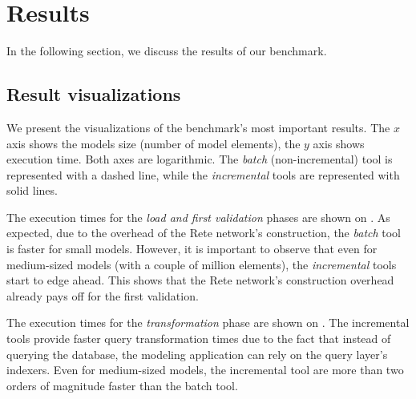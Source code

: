 \section{Results}
\label{evaluation-results}

In the following section, we discuss the results of our benchmark.

\subsection{Result visualizations}


We present the visualizations of the benchmark's most important results. The $x$ axis shows the models size (number of model elements), the $y$ axis shows execution time. Both axes are logarithmic. The \emph{batch} (non-incremental) tool is represented with a dashed line, while the \emph{incremental} tools are represented with solid lines.


The execution times for the \emph{load and first validation} phases are shown on .
As expected, due to the overhead of the Rete network's construction, the \emph{batch} tool is faster for small models. However, it is important to observe that even for medium-sized models (with a couple of million elements), the \emph{incremental} tools start to edge ahead. This shows that the Rete network's construction overhead already pays off for the first validation.


The execution times for the \emph{transformation} phase are shown on . The incremental tools provide faster query transformation times due to the fact that instead of querying the database, the modeling application can rely on the query layer's indexers. Even for medium-sized models, the incremental tool are more than two orders of magnitude faster than the batch tool.


